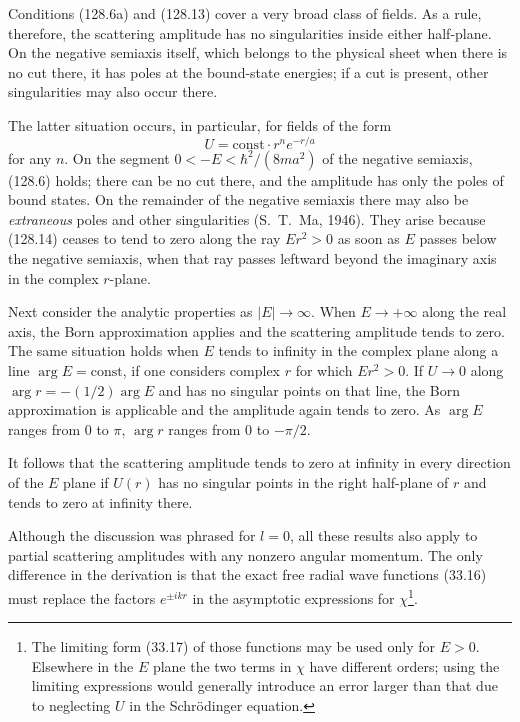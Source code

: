 Conditions (128.6a) and (128.13) cover a very broad class of fields. As a rule,
therefore, the scattering amplitude has no singularities inside either
half-plane. On the negative semiaxis itself, which belongs to the physical
sheet when there is no cut there, it has poles at the bound-state energies; if
a cut is present, other singularities may also occur there.

The latter situation occurs, in particular, for fields of the form
\begin{equation}
 U=\mathrm{const}\cdot r^n e^{-r/a}
 \tag{128.14}
\end{equation}
for any $n$. On the segment $0<-E<\hbar^2/(8ma^2)$ of the negative semiaxis,
(128.6) holds; there can be no cut there, and the amplitude has only the poles
of bound states. On the remainder of the negative semiaxis there may also be
\emph{extraneous} poles and other singularities (S.~T.~Ma, 1946). They arise
because (128.14) ceases to tend to zero along the ray $Er^2>0$ as soon as $E$
passes below the negative semiaxis, when that ray passes leftward beyond the
imaginary axis in the complex $r$-plane.

Next consider the analytic properties as $|E|\to\infty$. When
$E\to+\infty$ along the real axis, the Born approximation applies and the
scattering amplitude tends to zero. The same situation holds when $E$ tends
to infinity in the complex plane along a line $\arg E=\mathrm{const}$, if one
considers complex $r$ for which $Er^2>0$. If $U\to0$ along
$\arg r=-(1/2)\arg E$ and has no singular points on that line, the Born
approximation is applicable and the amplitude again tends to zero. As
$\arg E$ ranges from $0$ to $\pi$, $\arg r$ ranges from $0$ to $-\pi/2$.

It follows that the scattering amplitude tends to zero at infinity in every
direction of the $E$ plane if $U(r)$ has no singular points in the right
half-plane of $r$ and tends to zero at infinity there.

Although the discussion was phrased for $l=0$, all these results also apply to
partial scattering amplitudes with any nonzero angular momentum. The only
difference in the derivation is that the exact free radial wave functions
(33.16) must replace the factors $e^{\pm ikr}$ in the asymptotic expressions
for $\chi$\footnote{The limiting form (33.17) of those functions may be used
only for $E>0$. Elsewhere in the $E$ plane the two terms in $\chi$ have
different orders; using the limiting expressions would generally introduce an
error larger than that due to neglecting $U$ in the Schrödinger equation.}.

